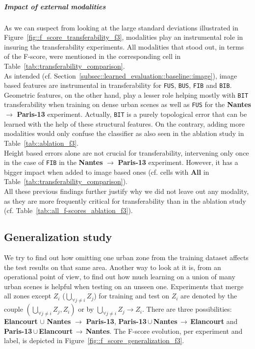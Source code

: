         \subparagraph{Impact of external modalities}
            As we can suspect from looking at the large standard deviations illustrated in Figure~\ref{fig::f_score_transferability_f3}, modalities play an instrumental role in insuring the transferability experiments.
            All modalities that stood out, in terms of the F-score, were mentioned in the corresponding cell in Table~\ref{tab::transferability_comparison}.\\
            As intended (cf. Section~\ref{subsec::learned_evaluation::baseline::image}), image based features are instrumental in transferability for \texttt{FUS}, \texttt{BUS}, \texttt{FIB} and \texttt{BIB}.\\
            Geometric features, on the other hand, play a lesser role helping mostly with \texttt{BIT} transferability when training on dense urban scenes as well as \texttt{FUS} for the \textbf{Nantes} \(\rightarrow\) \textbf{Paris-13} experiment.
            Actually, \texttt{BIT} is a purely topological error that can be learned with the help of these structural features.
            On the contrary, adding more modalities would only confuse the classifier as also seen in the ablation study in Table~\ref{tab::ablation_f3}.\\
            Height based errors alone are not crucial for transferability, intervening only once in the case of \texttt{FIB} in the \textbf{Nantes} \(\rightarrow\) \textbf{Paris-13} experiment.
            However, it has a bigger impact when added to image based ones (cf. cells with \textbf{All} in Table~\ref{tab::transferability_comparison}).\\
            All these previous findings further justify why we did not leave out any modality, as they are more frequently critical for transferability than in the ablation study (cf. Table~\ref{tab::all_f-scores_ablation_f3}).

    \subsection{Generalization study}
        \label{subsec::more_experiments::scalability::generalization}
        We try to find out how omitting one urban zone from the training dataset affects the test results on that same area.
        Another way to look at it is, from an operational point of view, to find out how much learning on a union of many urban scenes is helpful when testing on an unseen one.
        Experiments that merge all zones except $Z_i$ ($\underset{\forall j \neq i}{\bigcup} Z_j$) for training and test on $Z_i$ are denoted by the couple $(\underset{\forall j \neq i}{\bigcup} Z_j, Z_i)$ or by $ \underset{\forall j \neq i}{\bigcup} Z_j \rightarrow Z_i$.
        There are three possibilities: \textbf{Elancourt} $\cup$ \textbf{Nantes} \(\rightarrow\) \textbf{Paris-13}, \mbox{\textbf{Paris-13}}\,$\cup$\,\textbf{Nantes}\,\(\rightarrow\)\,\textbf{Elancourt} and \mbox{\textbf{Paris-13}}\,$\cup$\,\textbf{Elancourt}\,\(\rightarrow\)\,\textbf{Nantes}.
        The F-score evolution, per experiment and label, is depicted in Figure~\ref{fig::f_score_generalization_f3}.\\
    
